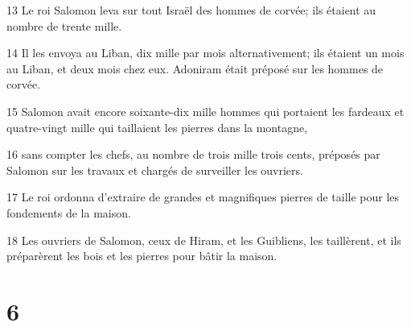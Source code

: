 \par 13 Le roi Salomon leva sur tout Israël des hommes de corvée; ils étaient au nombre de trente mille.
\par 14 Il les envoya au Liban, dix mille par mois alternativement; ils étaient un mois au Liban, et deux mois chez eux. Adoniram était préposé sur les hommes de corvée.
\par 15 Salomon avait encore soixante-dix mille hommes qui portaient les fardeaux et quatre-vingt mille qui taillaient les pierres dans la montagne,
\par 16 sans compter les chefs, au nombre de trois mille trois cents, préposés par Salomon sur les travaux et chargés de surveiller les ouvriers.
\par 17 Le roi ordonna d'extraire de grandes et magnifiques pierres de taille pour les fondements de la maison.
\par 18 Les ouvriers de Salomon, ceux de Hiram, et les Guibliens, les taillèrent, et ils préparèrent les bois et les pierres pour bâtir la maison.

\chapter{6}

